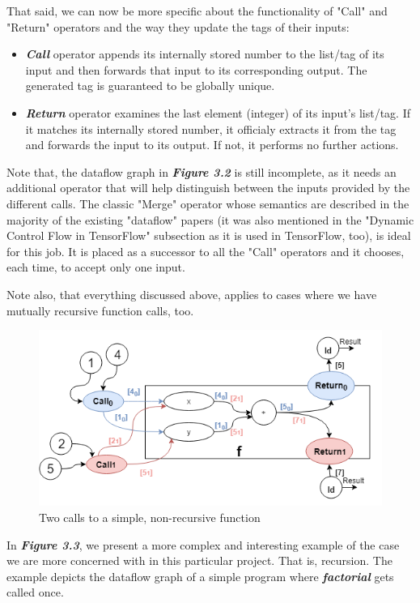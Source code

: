 \documentclass[ack,preface]{dithesis}
\begin{document}
That said, we can now be more specific about the functionality of  "Call" and "Return" operators and the way they update the tags of their inputs:
    \begin{itemize}
    \item \textit{\textbf{Call }} operator appends its internally stored number to the list/tag of its input and then forwards that input to its corresponding output. The generated tag is guaranteed to be globally unique.
    \item \textit{\textbf{Return }} operator examines the last element (integer) of its input's list/tag. If it matches its internally stored number, it officialy extracts it from the tag and forwards the input to its output. If not,  it performs no further actions.
    \end{itemize}

Note that, the dataflow graph in \textit{\textbf{Figure 3.2}} is still incomplete, as it needs an additional operator that will help distinguish between the inputs provided by the different calls. The classic "Merge" operator whose semantics are described in the majority of  the existing "dataflow" papers (it was also mentioned in the "Dynamic Control Flow in TensorFlow" subsection as it is used in TensorFlow, too), is ideal for this job. It is placed as a successor to all the "Call" operators and it chooses, each time, to accept only one input.

Note also, that everything discussed above, applies to cases where we have mutually recursive function calls, too. 

\begin{figure}
\centering
\includegraphics[scale=0.7]{figures/Example2}
\caption{Two calls to a simple, non-recursive function}
\end{figure}

In  \textit{\textbf{Figure 3.3}}, we present a more complex and interesting example of the case we are more concerned with in this particular project. That is, recursion. The example depicts the dataflow graph of a simple program where  \textit{\textbf{factorial}} gets called once.
\end{document}
